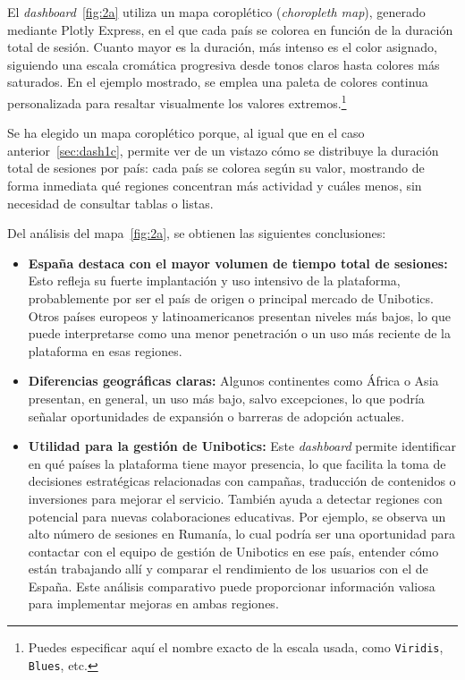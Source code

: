 \documentclass[a4paper, 12pt]{book}
\begin{document}
El \textit{dashboard}~\ref{fig:2a} utiliza un mapa coroplético (\textit{choropleth map}), generado mediante Plotly Express, en el que cada país se colorea en función de la duración total de sesión. Cuanto mayor es la duración, más intenso es el color asignado, siguiendo una escala cromática progresiva desde tonos claros hasta colores más saturados. En el ejemplo mostrado, se emplea una paleta de colores continua personalizada para resaltar visualmente los valores extremos.\footnote{Puedes especificar aquí el nombre exacto de la escala usada, como \texttt{Viridis}, \texttt{Blues}, etc.}

Se ha elegido un mapa coroplético porque, al igual que en el caso anterior~\ref{sec:dash1c}, permite ver de un vistazo cómo se distribuye la duración total de sesiones por país: cada país se colorea según su valor, mostrando de forma inmediata qué regiones concentran más actividad y cuáles menos, sin necesidad de consultar tablas o listas.

Del análisis del mapa~\ref{fig:2a}, se obtienen las siguientes conclusiones:

\begin{itemize}
  \item \textbf{España destaca con el mayor volumen de tiempo total de sesiones:} Esto refleja su fuerte implantación y uso intensivo de la plataforma, probablemente por ser el país de origen o principal mercado de Unibotics. Otros países europeos y latinoamericanos presentan niveles más bajos, lo que puede interpretarse como una menor penetración o un uso más reciente de la plataforma en esas regiones.

  \item \textbf{Diferencias geográficas claras:} Algunos continentes como África o Asia presentan, en general, un uso más bajo, salvo excepciones, lo que podría señalar oportunidades de expansión o barreras de adopción actuales.

  \item \textbf{Utilidad para la gestión de Unibotics:} Este \textit{dashboard} permite identificar en qué países la plataforma tiene mayor presencia, lo que facilita la toma de decisiones estratégicas relacionadas con campañas, traducción de contenidos o inversiones para mejorar el servicio. También ayuda a detectar regiones con potencial para nuevas colaboraciones educativas. Por ejemplo, se observa un alto número de sesiones en Rumanía, lo cual podría ser una oportunidad para contactar con el equipo de gestión de Unibotics en ese país, entender cómo están trabajando allí y comparar el rendimiento de los usuarios con el de España. Este análisis comparativo puede proporcionar información valiosa para implementar mejoras en ambas regiones.
\end{itemize}
\end{document}
